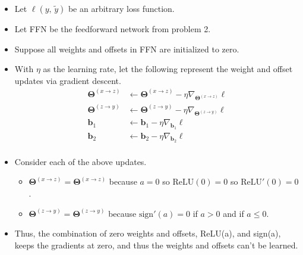 \begin{itemize}
    \item Let $\ell \left( y, \, \tilde{y} \right)$ be an arbitrary loss function. 
    \item Let FFN be the feedforward network from problem 2.
    \item Suppose all weights and offsets in FFN are initialized to zero.
    \item With $\eta$ as the learning rate, let the following represent the weight and offset updates via gradient descent.
	\begin{align*}
	    \mathbf{\Theta}^{\left( x \rightarrow z \right)} &\leftarrow \mathbf{\Theta}^{\left( x \rightarrow z \right)} - \eta \nabla_{\mathbf{\Theta}^{\left( x \rightarrow z \right)}} \ell \\
	    \mathbf{\Theta}^{\left( z \rightarrow y \right)} &\leftarrow \mathbf{\Theta}^{\left( z \rightarrow y \right)} - \eta \nabla_{\mathbf{\Theta}^{\left( z \rightarrow y \right)}} \ell \\
	    \mathbf{b}_1 &\leftarrow \mathbf{b}_1 - \eta \nabla_{\mathbf{b}_1} \ell \\
	    \mathbf{b}_2 &\leftarrow \mathbf{b}_2 - \eta \nabla_{\mathbf{b}_2} \ell \\
	\end{align*}
    \item Consider each of the above updates.
	\begin{itemize}
	    \item $\mathbf{\Theta}^{\left( x \rightarrow z \right)} = \mathbf{\Theta}^{\left( x \rightarrow z \right)}$ because $a=0$ so $\text{ReLU}(0) = 0$ so $\text{ReLU}'(0) = 0$.
	    \item $\mathbf{\Theta}^{\left( z \rightarrow y \right)} = \mathbf{\Theta}^{\left( z \rightarrow y \right)}$ because $\text{sign}'(a)=0$ if $a>0$ and if $a\leq0$.
	\end{itemize}
    \item Thus, the combination of zero weights and offsets, ReLU(a), and sign(a), keeps the gradients at zero, and thus the weights and offsets can't be learned. 
\end{itemize}
